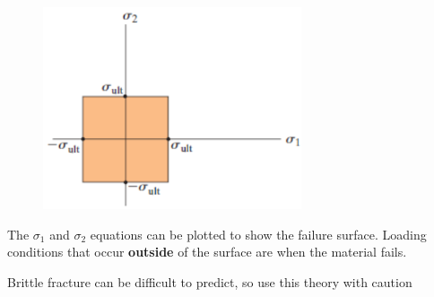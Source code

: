 \begin{figure}[!h]
\centering
\includegraphics[angle=0, width=3in]{Failure Theories-Figures/Brittle.png}
\vspace{-2mm}
\caption{\small {}}
\vspace{-3mm}
\label{Fig:BrittleFailure}
\end{figure}

\noindent The $\sigma_1$ and $\sigma_2$ equations can be plotted to show the failure surface. Loading conditions that occur \textbf{outside} of the surface are when the material fails.

\vspace{5pt}

\noindent Brittle fracture can be difficult to predict, so use this theory with caution